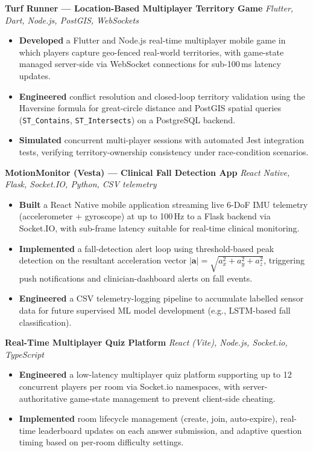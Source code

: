 \documentclass[10pt, a4paper]{article}
\newenvironment{project}[2]{%
  \textbf{\color{accent}#1} \hfill
  \small\textit{\color{light}#2}%
  \begin{itemize}%
}{%
  \end{itemize}%
  \vspace{2pt}%
}
\begin{document}
\begin{project}{Turf Runner --- Location-Based Multiplayer Territory Game}{Flutter, Dart, Node.js, PostGIS, WebSockets}
  \item \textbf{Developed} a Flutter and Node.js real-time multiplayer mobile game in which players
        capture geo-fenced real-world territories, with game-state managed server-side via
        WebSocket connections for sub-100\,ms latency updates.
  \item \textbf{Engineered} conflict resolution and closed-loop territory validation using the
        Haversine formula for great-circle distance and PostGIS spatial queries
        (\texttt{ST\_Contains}, \texttt{ST\_Intersects}) on a PostgreSQL backend.
  \item \textbf{Simulated} concurrent multi-player sessions with automated Jest integration tests,
        verifying territory-ownership consistency under race-condition scenarios.
\end{project}

\begin{project}{MotionMonitor (Vesta) --- Clinical Fall Detection App}{React Native, Flask, Socket.IO, Python, CSV telemetry}
  \item \textbf{Built} a React Native mobile application streaming live 6-DoF IMU telemetry
        (accelerometer + gyroscope) at up to 100\,Hz to a Flask backend via Socket.IO,
        with sub-frame latency suitable for real-time clinical monitoring.
  \item \textbf{Implemented} a fall-detection alert loop using threshold-based peak detection on
        the resultant acceleration vector $|\mathbf{a}|=\sqrt{a_x^2+a_y^2+a_z^2}$,
        triggering push notifications and clinician-dashboard alerts on fall events.
  \item \textbf{Engineered} a CSV telemetry-logging pipeline to accumulate labelled sensor data
        for future supervised ML model development (e.g., LSTM-based fall classification).
\end{project}

\begin{project}{Real-Time Multiplayer Quiz Platform}{React (Vite), Node.js, Socket.io, TypeScript}
  \item \textbf{Engineered} a low-latency multiplayer quiz platform supporting up to 12 concurrent
        players per room via Socket.io namespaces, with server-authoritative game-state management
        to prevent client-side cheating.
  \item \textbf{Implemented} room lifecycle management (create, join, auto-expire), real-time
        leaderboard updates on each answer submission, and adaptive question timing based on
        per-room difficulty settings.
\end{project}
\end{document}
